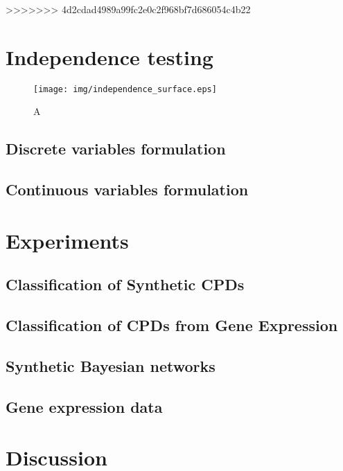 \documentclass{article} %
\begin{document}
>>>>>>> 4d2cdad4989a99fc2e0c2f968bf7d686054c4b22
\cite{margaritis2003learning}

\section{Independence testing}

\begin{figure}[h]
\centering
\texttt{[image: img/independence\_surface.eps]}
\caption{A}
\end{figure}


\subsection{Discrete variables formulation}

\subsection{Continuous variables formulation}

\section{Experiments}

\subsection{Classification of Synthetic CPDs}

\subsection{Classification of CPDs from Gene Expression}

\subsection{Synthetic Bayesian networks}

\subsection{Gene expression data}

\section{Discussion}

\begin{small}

%
%

\end{small}

%
\end{document}
